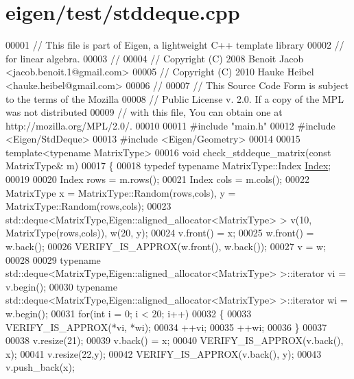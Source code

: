 \hypertarget{eigen_2test_2stddeque_8cpp_source}{}\section{eigen/test/stddeque.cpp}
\label{eigen_2test_2stddeque_8cpp_source}

\begin{DoxyCode}
00001 \textcolor{comment}{// This file is part of Eigen, a lightweight C++ template library}
00002 \textcolor{comment}{// for linear algebra.}
00003 \textcolor{comment}{//}
00004 \textcolor{comment}{// Copyright (C) 2008 Benoit Jacob <jacob.benoit.1@gmail.com>}
00005 \textcolor{comment}{// Copyright (C) 2010 Hauke Heibel <hauke.heibel@gmail.com>}
00006 \textcolor{comment}{//}
00007 \textcolor{comment}{// This Source Code Form is subject to the terms of the Mozilla}
00008 \textcolor{comment}{// Public License v. 2.0. If a copy of the MPL was not distributed}
00009 \textcolor{comment}{// with this file, You can obtain one at http://mozilla.org/MPL/2.0/.}
00010 
00011 \textcolor{preprocessor}{#include "main.h"}
00012 \textcolor{preprocessor}{#include <Eigen/StdDeque>}
00013 \textcolor{preprocessor}{#include <Eigen/Geometry>}
00014 
00015 \textcolor{keyword}{template}<\textcolor{keyword}{typename} MatrixType>
00016 \textcolor{keywordtype}{void} check\_stddeque\_matrix(\textcolor{keyword}{const} MatrixType& m)
00017 \{
00018   \textcolor{keyword}{typedef} \textcolor{keyword}{typename} MatrixType::Index \hyperlink{namespace_eigen_a62e77e0933482dafde8fe197d9a2cfde}{Index};
00019   
00020   Index rows = m.rows();
00021   Index cols = m.cols();
00022   MatrixType x = MatrixType::Random(rows,cols), y = MatrixType::Random(rows,cols);
00023   std::deque<MatrixType,Eigen::aligned\_allocator<MatrixType> > v(10, MatrixType(rows,cols)), w(20, y);
00024   v.front() = x;
00025   w.front() = w.back();
00026   VERIFY\_IS\_APPROX(w.front(), w.back());
00027   v = w;
00028 
00029   \textcolor{keyword}{typename} std::deque<MatrixType,Eigen::aligned\_allocator<MatrixType> >::iterator vi = v.begin();
00030   \textcolor{keyword}{typename} std::deque<MatrixType,Eigen::aligned\_allocator<MatrixType> >::iterator wi = w.begin();
00031   \textcolor{keywordflow}{for}(\textcolor{keywordtype}{int} i = 0; i < 20; i++)
00032   \{
00033     VERIFY\_IS\_APPROX(*vi, *wi);
00034     ++vi;
00035     ++wi;
00036   \}
00037 
00038   v.resize(21);  
00039   v.back() = x;
00040   VERIFY\_IS\_APPROX(v.back(), x);
00041   v.resize(22,y);
00042   VERIFY\_IS\_APPROX(v.back(), y);
00043   v.push\_back(x);

\end{DoxyCode}
